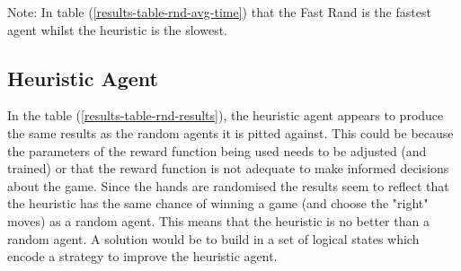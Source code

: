 \documentclass[journal]{IEEEtran}
\begin{document}
\noindent Note: In table (\ref{results-table-rnd-avg-time}) that the Fast Rand is the fastest agent whilst the heuristic is the slowest.

\subsection{Heuristic Agent}
In the table (\ref{results-table-rnd-results}), the heuristic agent appears to produce the same results as the random agents it is pitted against. This could be because the parameters of the reward function being used needs to be adjusted (and trained) or that the reward function is not adequate to make informed decisions about the game. Since the hands are randomised the results seem to reflect that the heuristic has the same chance of winning a game (and choose the "right" moves) as a random agent. This means that the heuristic is no better than a random agent. A solution would be to build in a set of logical states which encode a strategy to improve the heuristic agent.\\
\end{document}
